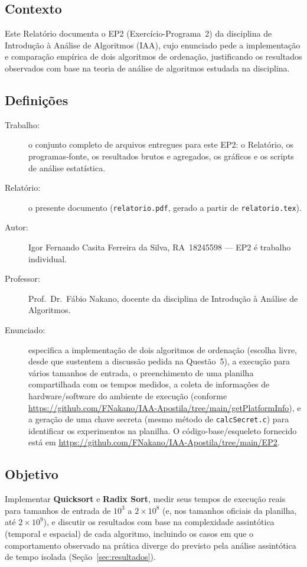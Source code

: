 \documentclass[11pt,a4paper]{article}
\newcommand{\segurl}[1]{\underline{\vphantom{Ag}#1}\hspace{0pt}}
\newcommand{\urlPlatformInfo}{\href{https://github.com/FNakano/IAA-Apostila/tree/main/getPlatformInfo}{\ttfamily\color{linkblue}\segurl{https://github.com/}\allowbreak\segurl{FNakano/}\allowbreak\segurl{IAA-Apostila/}\allowbreak\segurl{tree/}\allowbreak\segurl{main/}\allowbreak\segurl{getPlatformInfo}}}
\newcommand{\urlRepoEP}{\href{https://github.com/FNakano/IAA-Apostila/tree/main/EP2}{\ttfamily\color{linkblue}\segurl{https://github.com/}\allowbreak\segurl{FNakano/}\allowbreak\segurl{IAA-Apostila/}\allowbreak\segurl{tree/}\allowbreak\segurl{main/}\allowbreak\segurl{EP2}}}
\renewcommand{\_}{\underscoreoriginal\allowbreak}
\begin{document}
\subsection{Contexto}

Este Relatório documenta o EP2 (Exercício-Programa~2) da disciplina de
Introdução à Análise de Algoritmos (IAA), cujo enunciado pede a
implementação e comparação empírica de dois algoritmos de ordenação,
justificando os resultados observados com base na teoria de análise de
algoritmos estudada na disciplina.

\subsection{Definições}

\begin{description}
  \item[Trabalho:] o conjunto completo de arquivos entregues para este
    EP2: o Relatório, os programas-fonte, os resultados brutos e
    agregados, os gráficos e os scripts de análise estatística.
  \item[Relatório:] o presente documento (\texttt{relatorio.pdf}, gerado
    a partir de \texttt{relatorio.tex}).
  \item[Autor:] Igor Fernando Casita Ferreira da Silva, RA~18245598 ---
    EP2 é trabalho individual.
  \item[Professor:] Prof.\ Dr.\ Fábio Nakano, docente da disciplina de
    Introdução à Análise de Algoritmos.
  \item[Enunciado:] especifica a implementação de dois algoritmos de
    ordenação (escolha livre, desde que sustentem a discussão pedida na
    Questão~5), a execução para vários tamanhos de entrada, o
    preenchimento de uma planilha compartilhada com os tempos medidos, a
    coleta de informações de hardware/software do ambiente de execução
    (conforme \urlPlatformInfo),
    e a geração de uma chave secreta (mesmo método de
    \texttt{calcSecret.c}) para identificar os experimentos na planilha.
    O código-base/esqueleto fornecido está em
    \urlRepoEP.
\end{description}

\subsection{Objetivo}

Implementar \textbf{Quicksort} e \textbf{Radix Sort}, medir seus tempos
de execução reais para tamanhos de entrada de $10^3$ a $2\times10^8$
(e, nos tamanhos oficiais da planilha, até $2\times10^9$), e discutir os
resultados com base na complexidade assintótica (temporal e espacial) de
cada algoritmo, incluindo os casos em que o comportamento observado na
prática diverge do previsto pela análise assintótica de tempo isolada
(Seção~\ref{sec:resultados}).
\end{document}
